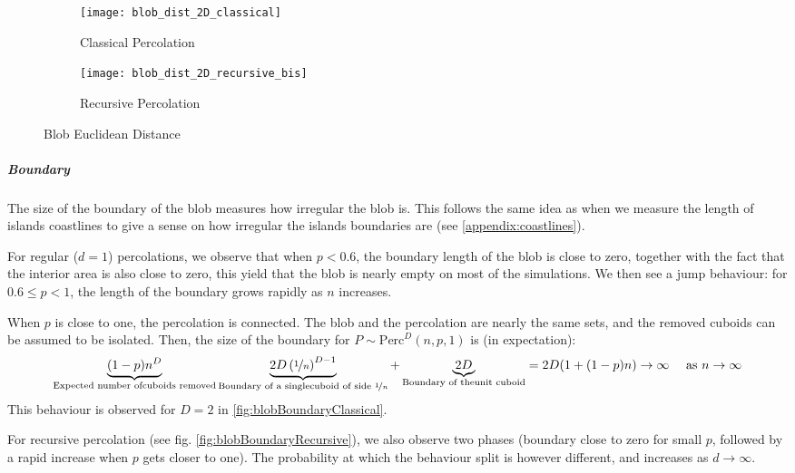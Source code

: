 \begin{figure}[!h]
	\centering
	\begin{subfigure}{.49\textwidth}
		\texttt{[image: blob\_dist\_2D\_classical]}
		\centering
		\caption{Classical Percolation}
		\label{fig:blobEuclideanDistanceClassical}
	\end{subfigure}
	\begin{subfigure}{.49\textwidth}
		\texttt{[image: blob\_dist\_2D\_recursive\_bis]}
		\centering
		\caption{Recursive Percolation}
		\label{fig:blobEuclideanDistanceRecursive}
	\end{subfigure}
	\caption{Blob Euclidean Distance}
	\label{fig:blobEuclideanDistance}
\end{figure}


\subparagraph{Boundary}
The size of the boundary of the blob measures how irregular the blob is.
This follows the same idea as when we measure the length of islands coastlines to give a sense on how irregular the islands boundaries are (see \ref{appendix:coastlines}).

For regular ($d=1$) percolations, we observe that when $p<0.6$, the boundary length of the blob is close to zero, together with the fact that the interior area is also close to zero, this yield that the blob is nearly empty on most of the simulations.
We then see a jump behaviour: for $0.6 \leq p <1$, the length of the boundary grows rapidly as $n$ increases.

When $p$ is close to one, the percolation is connected.
The blob and the percolation are nearly the same sets, and the removed cuboids can be assumed to be isolated.
Then, the size of the boundary for $P \sim \text{Perc}^D(n,p,1)$ is (in expectation):
$$\underbrace{(1-p)n^D}_{\text{Expected number of\\cuboids removed}} \underbrace{2D \left( \nicefrac{1}{n} \right)^{D-1}}_{\text{Boundary of a single\\cuboid of side } \nicefrac{1}{n}}
+ \underbrace{2D}_{\text{Boundary of the\\unit cuboid}} = 2D (1 + (1-p)n) \to \infty \quad \text{ as } n \to \infty$$
This behaviour is observed for $D=2$ in \ref{fig:blobBoundaryClassical}.

For recursive percolation (see fig. \ref{fig:blobBoundaryRecursive}), we also observe two phases (boundary close to zero for small $p$, followed by a rapid increase when $p$ gets closer to one).
The probability at which the behaviour split is however different, and increases as $d \to \infty$.

